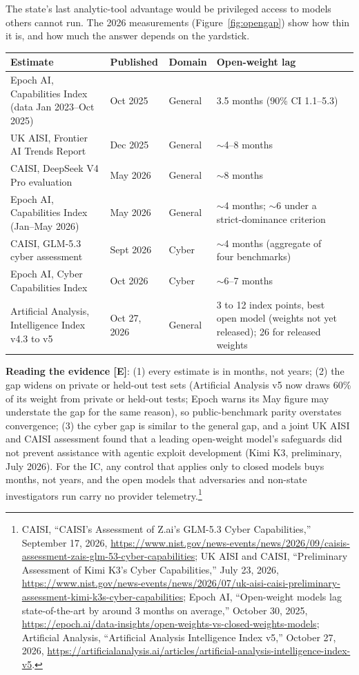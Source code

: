 \documentclass[11pt,letterpaper]{article}
\makeatletter
\newcommand{\etraneed}[1]{\par\if@nobreak\else\penalty\z@\ifdim\pagegoal<\maxdimen\ifdim\dimexpr\pagegoal-\pagetotal\relax<\dimexpr#1\relax\newpage\fi\fi\fi}
\makeatother
\begin{document}
\etraneed{16\baselineskip}
\begin{keybox}
The state's last analytic-tool advantage would be privileged access to models others cannot run. The 2026 measurements (Figure~\ref{fig:opengap}) show how thin it is, and how much the answer depends on the yardstick.
\begin{center}
\scriptsize
\begin{tabularx}{\linewidth}{ZY{1.25}Y{0.55}Y{0.5}Y{1.7}}
\toprule
\textbf{Estimate} & \textbf{Published} & \textbf{Domain} & \textbf{Open-weight lag} \\
\midrule
Epoch AI, Capabilities Index (data Jan 2023--Oct 2025) & Oct 2025 & General & 3.5 months (90\% CI 1.1--5.3) \\
UK AISI, Frontier AI Trends Report & Dec 2025 & General & $\sim$4--8 months \\
CAISI, DeepSeek V4 Pro evaluation & May 2026 & General & $\sim$8 months \\
Epoch AI, Capabilities Index (Jan--May 2026) & May 2026 & General & $\sim$4 months; $\sim$6 under a strict-dominance criterion \\
CAISI, GLM-5.3 cyber assessment & Sept 2026 & Cyber & $\sim$4 months (aggregate of four benchmarks) \\
Epoch AI, Cyber Capabilities Index & Oct 2026 & Cyber & $\sim$6--7 months \\
Artificial Analysis, Intelligence Index v4.3 to v5 & Oct 27, 2026 & General & 3 to 12 index points, best open model (weights not yet released); 26 for released weights \\
\bottomrule
\end{tabularx}
\end{center}
\textbf{Reading the evidence [E]}: (1) every estimate is in months, not years; (2) the gap widens on private or held-out test sets (Artificial Analysis v5 now draws 60\% of its weight from private or held-out tests; Epoch warns its May figure may understate the gap for the same reason), so public-benchmark parity overstates convergence; (3) the cyber gap is similar to the general gap, and a joint UK AISI and CAISI assessment found that a leading open-weight model's safeguards did not prevent assistance with agentic exploit development (Kimi K3, preliminary, July 2026). For the IC, any control that applies only to closed models buys months, not years, and the open models that adversaries and non-state investigators run carry no provider telemetry.\footnote{CAISI, ``CAISI's Assessment of Z.ai's GLM-5.3 Cyber Capabilities,'' September 17, 2026, \url{https://www.nist.gov/news-events/news/2026/09/caisis-assessment-zais-glm-53-cyber-capabilities}; UK AISI and CAISI, ``Preliminary Assessment of Kimi K3's Cyber Capabilities,'' July 23, 2026, \url{https://www.nist.gov/news-events/news/2026/07/uk-aisi-caisi-preliminary-assessment-kimi-k3s-cyber-capabilities}; Epoch AI, ``Open-weight models lag state-of-the-art by around 3 months on average,'' October 30, 2025, \url{https://epoch.ai/data-insights/open-weights-vs-closed-weights-models}; Artificial Analysis, ``Artificial Analysis Intelligence Index v5,'' October 27, 2026, \url{https://artificialanalysis.ai/articles/artificial-analysis-intelligence-index-v5}.}

\end{keybox}
\end{document}
